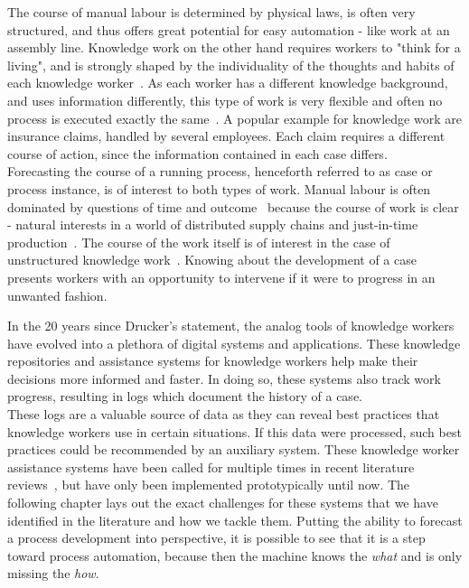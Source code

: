 The course of manual labour is determined by physical laws, is often very structured, and thus offers great potential for easy automation - like work at an assembly line. Knowledge work on the other hand requires workers to "think for a living", and is strongly shaped by the individuality of the thoughts and habits of each knowledge worker~\cite{drucker1999}. As each worker has a different knowledge background, and uses information differently, this type of work is very flexible and often no process is executed exactly the same~\cite{hewelt2016}. A popular example for knowledge work are insurance claims, handled by several employees. Each claim requires a different course of action, since the information contained in each case differs.\\

Forecasting the course of a running process, henceforth referred to as case or process instance, is of interest to both types of work. Manual labour is often dominated by questions of time and outcome~\cite{rogge2013} because the course of work is clear - natural interests in a world of distributed supply chains and just-in-time production~\cite{web:economist:jit}. The course of the work itself is of interest in the case of unstructured knowledge work~\cite{francescomarino2015}. Knowing about the development of a case presents workers with an opportunity to intervene if it were to progress in an unwanted fashion.

In the 20 years since Drucker's statement, the analog tools of knowledge workers have evolved into a plethora of digital systems and applications. These knowledge repositories and assistance systems for knowledge workers help make their decisions more informed and faster. In doing so, these systems also track work progress, resulting in logs which document the history of a case.\\

These logs are a valuable source of data as they can reveal best practices that knowledge workers use in certain situations. If this data were processed, such best practices could be recommended by an auxiliary system. These knowledge worker assistance systems have been called for multiple times in recent literature reviews~\cite{hauder2014, francescomarino2018}, but have only been implemented prototypically until now. The following chapter lays out the exact challenges for these systems that we have identified in the literature and how we tackle them. Putting the ability to forecast a process development into perspective, it is possible to see that it is a step toward process automation, because then the machine knows the \textit{what} and is only missing the \textit{how}.

